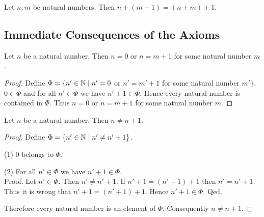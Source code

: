 \documentclass[10pt]{article}
\begin{document}
  \begin{forthel}
    \begin{axiom}[id=ARITHMETIC_03_4427935386238924,printid]
      Let $n, m$ be natural numbers.
      Then $n + (m + 1) = (n + m) + 1$.
    \end{axiom}
  \end{forthel}


  \subsection*{Immediate Consequences of the Axioms}

  \begin{forthel}
    \begin{proposition}[id=ARITHMETIC_01_4966080109871104,printid]
      Let $n$ be a natural number.
      Then $n = 0$ or $n = m + 1$ for some natural number $m$.
    \end{proposition}
    \begin{proof}
      Define $\Phi = \{ n' \in \mathbb{N} \mid n' = 0$ or $n' = m' + 1$ for some natural number $m' \}$.
      $0 \in \Phi$ and for all $n' \in  \Phi$ we have $n' + 1 \in \Phi$.
      Hence every natural number is contained in $\Phi$.
      Thus $n = 0$ or $n = m + 1$ for some natural number $m$.
    \end{proof}
  \end{forthel}

  \begin{forthel}
    \begin{proposition}[id=ARITHMETIC_01_5996049267163136,printid]
      Let $n$ be a natural number.
      Then $n \neq n + 1$.
    \end{proposition}
    \begin{proof}
      Define $\Phi = \{ n' \in \mathbb{N} \mid n' \neq n' + 1 \}$.

      (1) $0$ belongs to $\Phi$.

      (2) For all $n' \in \Phi$ we have $n' + 1 \in \Phi$. \\
      Proof.
        Let $n' \in \Phi$.
        Then $n' \neq n' + 1$.
        If $n' + 1 = (n' + 1) + 1$ then $n' = n' + 1$.
        Thus it is wrong that $n' + 1 = (n' + 1) + 1$.
        Hence $n' + 1 \in \Phi$.
      Qed.

      Therefore every natural number is an element of $\Phi$.
      Consequently $n \neq n + 1$.
    \end{proof}
  \end{forthel}
\end{document}

